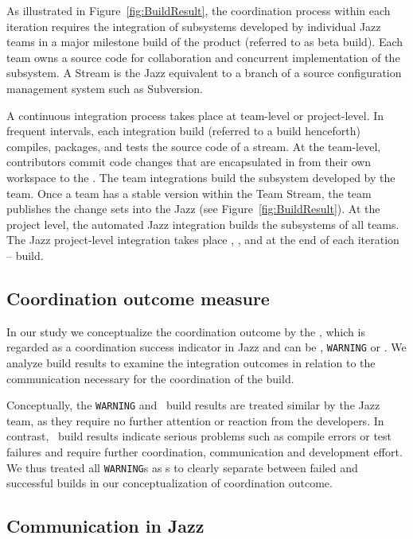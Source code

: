 As illustrated in Figure~\ref{fig:BuildResult}, the coordination process within
each iteration requires the integration of subsystems developed by individual
Jazz teams in a major milestone build of the product (referred to as beta build).
Each team owns a source code  for collaboration and concurrent
implementation of the subsystem. A Stream is the Jazz equivalent to a branch of a
source configuration management system such as Subversion.

A continuous integration process takes place at team-level or project-level. In
frequent intervals, each integration build (referred to a build henceforth)
compiles, packages, and tests the source code of a stream. At the team-level,
contributors commit code changes that are encapsulated in  from
their own workspace to the . The team integrations build the
subsystem developed by the team. Once a team has a stable version within the Team
Stream, the team publishes the change sets into the Jazz  (see Figure~\ref{fig:BuildResult}). At the project level, the automated
Jazz integration builds the subsystems of all teams. The Jazz project-level
integration takes place , , and at the end of each
iteration --  build.

\subsection{Coordination outcome measure}
In our study we conceptualize the coordination outcome by the ,
which is regarded as a coordination success indicator in Jazz and can be \error,
\texttt{WARNING} or \ok. We analyze build results to examine the integration
outcomes in relation to the communication necessary for the coordination of the
build.

Conceptually, the \texttt{WARNING} and \ok\ build results are treated similar by
the Jazz team, as they require no further attention or reaction from the
developers. In contrast, \error\ build results indicate serious problems such as
compile errors or test failures and require further coordination, communication
and development effort. We thus treated all \texttt{WARNING}s as \ok s to clearly
separate between failed and successful builds in our conceptualization of
coordination outcome.


\subsection{Communication in Jazz}

